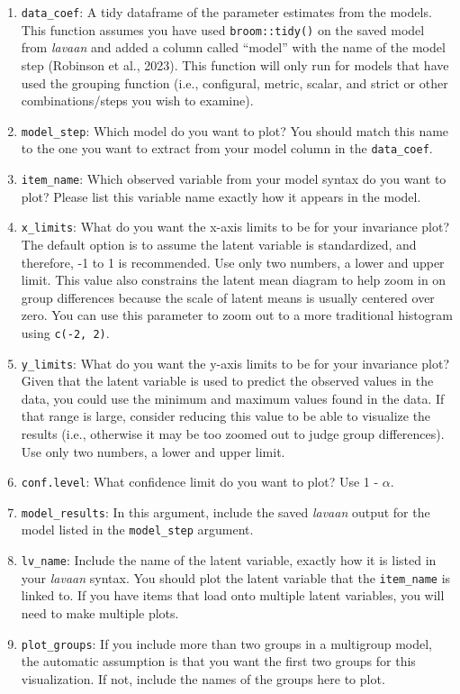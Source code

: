 \documentclass[
  man,floatsintext]{apa7}
\providecommand{\tightlist}{%
  \setlength{\itemsep}{0pt}\setlength{\parskip}{0pt}}
\begin{document}
\begin{enumerate}
\def\labelenumi{\arabic{enumi})}
\tightlist
\item
  \texttt{data\_coef}: A tidy dataframe of the parameter estimates from the models. This function assumes you have used \texttt{broom::tidy()} on the saved model from \emph{lavaan} and added a column called ``model'' with the name of the model step (Robinson et al., 2023). This function will only run for models that have used the grouping function (i.e., configural, metric, scalar, and strict or other combinations/steps you wish to examine).
\item
  \texttt{model\_step}: Which model do you want to plot? You should match this name to the one you want to extract from your model column in the \texttt{data\_coef}.
\item
  \texttt{item\_name}: Which observed variable from your model syntax do you want to plot? Please list this variable name exactly how it appears in the model.
\item
  \texttt{x\_limits}: What do you want the x-axis limits to be for your invariance plot? The default option is to assume the latent variable is standardized, and therefore, -1 to 1 is recommended. Use only two numbers, a lower and upper limit. This value also constrains the latent mean diagram to help zoom in on group differences because the scale of latent means is usually centered over zero. You can use this parameter to zoom out to a more traditional histogram using \texttt{c(-2,\ 2)}.
\item
  \texttt{y\_limits}: What do you want the y-axis limits to be for your invariance plot? Given that the latent variable is used to predict the observed values in the data, you could use the minimum and maximum values found in the data. If that range is large, consider reducing this value to be able to visualize the results (i.e., otherwise it may be too zoomed out to judge group differences). Use only two numbers, a lower and upper limit.
\item
  \texttt{conf.level}: What confidence limit do you want to plot? Use 1 - \(\alpha\).
\item
  \texttt{model\_results}: In this argument, include the saved \emph{lavaan} output for the model listed in the \texttt{model\_step} argument.
\item
  \texttt{lv\_name}: Include the name of the latent variable, exactly how it is listed in your \emph{lavaan} syntax. You should plot the latent variable that the \texttt{item\_name} is linked to. If you have items that load onto multiple latent variables, you will need to make multiple plots.
\item
  \texttt{plot\_groups}: If you include more than two groups in a multigroup model, the automatic assumption is that you want the first two groups for this visualization. If not, include the names of the groups here to plot.
\end{enumerate}
\end{document}
